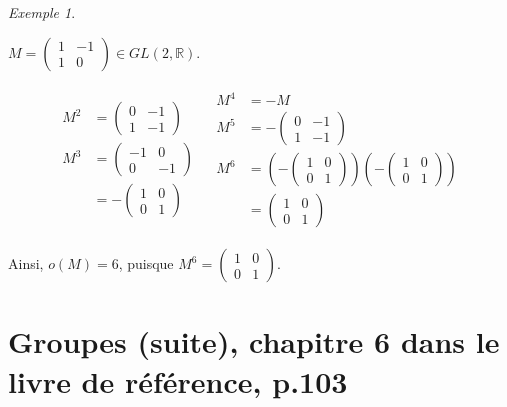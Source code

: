 \documentclass{report}
\newcommand*{\reels}{\mathbb{R}}
\theoremstyle{definition}
\theoremstyle{remark}
\newtheorem*{exem}{Exemple}
\begin{document}
	
	\begin{exem}
		~

		$M=\begin{pmatrix}
			1&-1\\1&0
		\end{pmatrix} \in GL(2, \reels)$.

		\begin{align*}
			\begin{split}
				M^2&= \begin{pmatrix}
					0&-1\\1&-1
				\end{pmatrix}\\
				M^3&= \begin{pmatrix}
					-1&0\\0&-1
				\end{pmatrix}\\
				&= -\begin{pmatrix}
					1&0\\0&1
				\end{pmatrix}
			\end{split}
			&
			\begin{split}
				M^4&= -M\\
				M^5&= -\begin{pmatrix}
					0&-1\\1&-1
				\end{pmatrix}\\
				M^6&= \left( -\begin{pmatrix}
					1&0\\0&1
				\end{pmatrix} \right) \left( -\begin{pmatrix}
					1&0\\0&1
				\end{pmatrix} \right)\\
				&= \begin{pmatrix}
					1&0\\0&1
				\end{pmatrix}
			\end{split}
		\end{align*}

		Ainsi, $o(M) = 6$, puisque $M^6 = \begin{pmatrix}
			1&0\\0&1
		\end{pmatrix}$.
	\end{exem}

	\chapter[Groupes (suite)]{Groupes (suite), chapitre 6 dans le livre de r\'ef\'erence, p.103}
\end{document}
